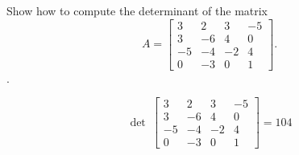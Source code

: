 
\begin{exerciseStatement}


Show how to compute the determinant of the matrix \[A= \left[\begin{array}{cccc}
3 & 2 & 3 & -5 \\
3 & -6 & 4 & 0 \\
-5 & -4 & -2 & 4 \\
0 & -3 & 0 & 1
\end{array}\right] .\].


\end{exerciseStatement}
    
\begin{exerciseAnswer} 
\[\operatorname{det}\  \left[\begin{array}{cccc}
3 & 2 & 3 & -5 \\
3 & -6 & 4 & 0 \\
-5 & -4 & -2 & 4 \\
0 & -3 & 0 & 1
\end{array}\right] = 104 \]
\end{exerciseAnswer}
    
